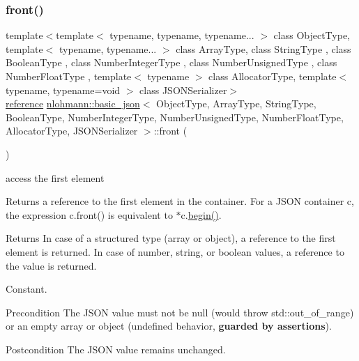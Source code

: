 \subsubsection{\texorpdfstring{front()}{front()}\hspace{0.1cm}{\footnotesize\ttfamily [1/2]}}
{\footnotesize\ttfamily template$<$template$<$ typename, typename, typename... $>$ class Object\+Type, template$<$ typename, typename... $>$ class Array\+Type, class String\+Type , class Boolean\+Type , class Number\+Integer\+Type , class Number\+Unsigned\+Type , class Number\+Float\+Type , template$<$ typename $>$ class Allocator\+Type, template$<$ typename, typename=void $>$ class J\+S\+O\+N\+Serializer$>$ \\
\hyperlink{classnlohmann_1_1basic__json_ac6a5eddd156c776ac75ff54cfe54a5bc}{reference} \hyperlink{classnlohmann_1_1basic__json}{nlohmann\+::basic\+\_\+json}$<$ Object\+Type, Array\+Type, String\+Type, Boolean\+Type, Number\+Integer\+Type, Number\+Unsigned\+Type, Number\+Float\+Type, Allocator\+Type, J\+S\+O\+N\+Serializer $>$\+::front (\begin{DoxyParamCaption}{ }\end{DoxyParamCaption})\hspace{0.3cm}{\ttfamily [inline]}}



access the first element 

Returns a reference to the first element in the container. For a J\+S\+ON container {\ttfamily c}, the expression {\ttfamily c.\+front()} is equivalent to {\ttfamily $\ast$c.\hyperlink{classnlohmann_1_1basic__json_a0ff28dac23f2bdecee9564d07f51dcdc}{begin()}}.

\begin{DoxyReturn}{Returns}
In case of a structured type (array or object), a reference to the first element is returned. In case of number, string, or boolean values, a reference to the value is returned.
\end{DoxyReturn}
Constant.

\begin{DoxyPrecond}{Precondition}
The J\+S\+ON value must not be {\ttfamily null} (would throw {\ttfamily std\+::out\+\_\+of\+\_\+range}) or an empty array or object (undefined behavior, {\bfseries guarded by assertions}). 
\end{DoxyPrecond}
\begin{DoxyPostcond}{Postcondition}
The J\+S\+ON value remains unchanged.
\end{DoxyPostcond}

